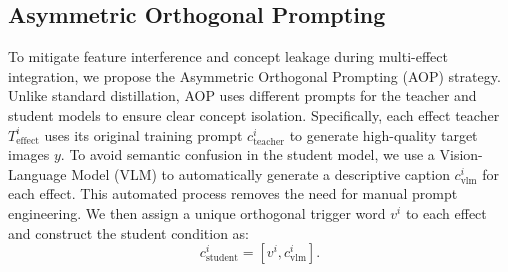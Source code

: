 \documentclass{llmxive}
\begin{document}

\subsection{Asymmetric Orthogonal Prompting }\label{method:4_3}
To mitigate feature interference and concept leakage during multi-effect integration, we propose the Asymmetric Orthogonal Prompting  (AOP) strategy. Unlike standard distillation, AOP uses different prompts for the teacher and student models to ensure clear concept isolation. Specifically, each effect teacher $T_{\text{effect}}^{i}$ uses its original training prompt $c_{\text{teacher}}^{i}$ to generate high-quality target images $y$. To avoid semantic confusion in the student model, we use a Vision-Language Model (VLM) to automatically generate a descriptive caption $c_{\text{vlm}}^{i}$ for each effect. This automated process removes the need for manual prompt engineering. We then assign a unique orthogonal trigger word $v^{i}$ to each effect and construct the student condition as:
\begin{equation}
c_{\text{student}}^{i} = [v^{i}, c_{\text{vlm}}^{i}].
\end{equation}
\end{document}
